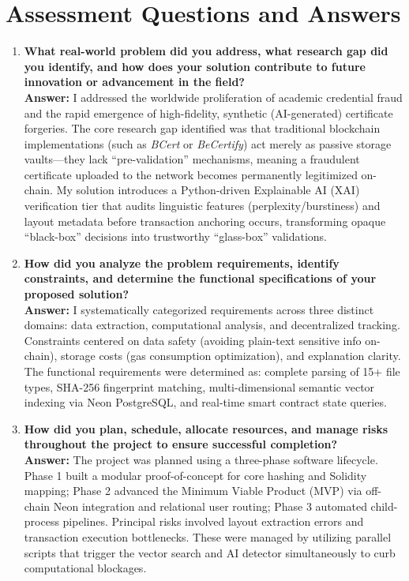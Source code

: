 \section{Assessment Questions and Answers}
\begin{enumerate}[label=\roman*.]
    \item \textbf{What real-world problem did you address, what research gap did you identify, and how does your solution contribute to future innovation or advancement in the field?} \\
    \textbf{Answer:} I addressed the worldwide proliferation of academic credential fraud and the rapid emergence of high-fidelity, synthetic (AI-generated) certificate forgeries. The core research gap identified was that traditional blockchain implementations (such as \textit{BCert} or \textit{BeCertify}) act merely as passive storage vaults—they lack ``pre-validation'' mechanisms, meaning a fraudulent certificate uploaded to the network becomes permanently legitimized on-chain. My solution introduces a Python-driven Explainable AI (XAI) verification tier that audits linguistic features (perplexity/burstiness) and layout metadata before transaction anchoring occurs, transforming opaque ``black-box'' decisions into trustworthy ``glass-box'' validations.

    \item \textbf{How did you analyze the problem requirements, identify constraints, and determine the functional specifications of your proposed solution?} \\
    \textbf{Answer:} I systematically categorized requirements across three distinct domains: data extraction, computational analysis, and decentralized tracking. Constraints centered on data safety (avoiding plain-text sensitive info on-chain), storage costs (gas consumption optimization), and explanation clarity. The functional requirements were determined as: complete parsing of 15+ file types, SHA-256 fingerprint matching, multi-dimensional semantic vector indexing via Neon PostgreSQL, and real-time smart contract state queries.

    \item \textbf{How did you plan, schedule, allocate resources, and manage risks throughout the project to ensure successful completion?} \\
    \textbf{Answer:} The project was planned using a three-phase software lifecycle. Phase 1 built a modular proof-of-concept for core hashing and Solidity mapping; Phase 2 advanced the Minimum Viable Product (MVP) via off-chain Neon integration and relational user routing; Phase 3 automated child-process pipelines. Principal risks involved layout extraction errors and transaction execution bottlenecks. These were managed by utilizing parallel scripts that trigger the vector search and AI detector simultaneously to curb computational blockages.


\end{enumerate}
